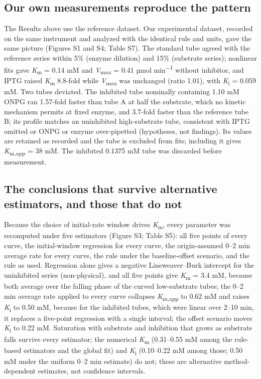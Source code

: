 \documentclass[9pt,twocolumn]{extarticle}
\newcommand{\Km}{\textit{K}\textsubscript{m}}
\newcommand{\Kmapp}{\textit{K}\textsubscript{m,app}}
\newcommand{\Vmax}{\textit{V}\textsubscript{max}}
\newcommand{\Ki}{\textit{K}\textsubscript{i}}
\newcommand{\umolmin}{µmol min\textsuperscript{−1}}
\newcommand{\dash}{–}
\begin{document}
\subsection{Our own measurements reproduce the pattern}
The Results above use the reference dataset. Our experimental dataset, recorded on the same instrument and analyzed with the identical rule and units, gave the same picture (Figures S1 and S4; Table S7). The standard tube agreed with the reference series within 5\% (enzyme dilution) and 15\% (substrate series); nonlinear fits gave \Km{} = 0.14 mM and \Vmax{} = 0.41 \umolmin{} without inhibitor, and IPTG raised \Km{} 8.8-fold while \Vmax{} was unchanged (ratio 1.01), with \Ki{} = 0.059 mM. Two tubes deviated. The inhibited tube nominally containing 1.10 mM ONPG ran 1.57-fold faster than tube A at half the substrate, which no kinetic mechanism permits at fixed enzyme, and 3.7-fold faster than the reference tube B; its profile matches an uninhibited high-substrate tube, consistent with IPTG omitted or ONPG or enzyme over-pipetted (hypotheses, not findings). Its values are retained as recorded and the tube is excluded from fits; including it gives \Kmapp{} = 38 mM. The inhibited 0.1375 mM tube was discarded before measurement.

\subsection{The conclusions that survive alternative estimators, and those that do not}
Because the choice of initial-rate window drives \Km, every parameter was recomputed under five estimators (Figure S3; Table S5): all five points of every curve, the initial-window regression for every curve, the origin-assumed 0\dash 2 min average rate for every curve, the rule under the baseline-offset scenario, and the rule as used. Regression alone gives a negative Lineweaver\dash Burk intercept for the uninhibited series (non-physical), and all five points give \Km{} = 3.4 mM, because both average over the falling phase of the curved low-substrate tubes; the 0\dash 2 min average rate applied to every curve collapses \Kmapp{} to 0.62 mM and raises \Ki{} to 0.50 mM, because for the inhibited tubes, which were linear over 2\dash 10 min, it replaces a five-point regression with a single interval; the offset scenario moves \Ki{} to 0.22 mM. Saturation with substrate and inhibition that grows as substrate falls survive every estimator; the numerical \Km{} (0.31\dash0.55 mM among the rule-based estimators and the global fit) and \Ki{} (0.10\dash0.22 mM among those; 0.50 mM under the uniform 0\dash 2 min estimate) do not; these are alternative method-dependent estimates, not confidence intervals.
\end{document}
